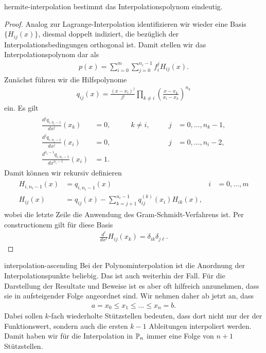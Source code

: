 \begin{Satz}{hermite-interpolation}
   bestimmt das
  Interpolationspolynom eindeutig.
\end{Satz}

\begin{proof}
  Analog zur Lagrange-Interpolation identifizieren wir wieder eine
  Basis $\{H_{ij}(x)\}$, diesmal doppelt indiziert, die bezüglich der
  Interpolationsbedingungen orthogonal ist. Damit stellen wir das
  Interpolationspolynom dar als
  \begin{gather}
    p(x) = \sum_{i=0}^m \sum_{j=0}^{n_i-1} f_i^j H_{ij}(x).
  \end{gather}
  Zunächst führen wir die Hilfspolynome
  \begin{gather}
    q_{ij}(x) = \frac{(x-x_i)^j}{j!}\prod_{k\neq i}
    \left(\frac{x-x_k}{x_i-x_k}\right)^{n_k}
  \end{gather}
  ein. Es gilt
  \begin{gather}
    \begin{aligned}
      \frac{d^j q_{i,n_i-1}}{d x^j} (x_k) &=0,
      \quad &k\neq i,&\quad& j&=0,\dots,n_{k}-1,\\
      \frac{d^j q_{i,n_i-1}}{d x^j} (x_i) &=0,
      \qquad &&& j&=0,\dots,n_{i}-2,\\   
      \frac{d^{n_{i}-1} q_{i,n_i-1}}{d x^{n_{i}-1}} (x_i) &=1.
      \qquad &&&& 
    \end{aligned}
  \end{gather}
  Damit können wir rekursiv definieren
  \begin{gather}
    \begin{aligned}
      H_{i,n_i-1}(x) &= q_{i,n_i-1}(x)
      & i&= 0,\dots,m\\
      H_{ij}(x) &= q_{ij}(x) - \sum_{k=j+1}^{n_i-1} q_{ij}^{(k)}(x_i) H_{ik}(x),
    \end{aligned}
  \end{gather}
  wobei die letzte Zeile die Anwendung des Gram-Schmidt-Verfahrens
  ist. Per constructionem gilt für diese Basis
  \begin{gather}
    \frac{d^\ell}{dx^\ell} H_{ij}(x_k) = \delta_{ik}\delta_{j\ell}.
  \end{gather}
\end{proof}

\begin{Notation}{interpolation-ascending}
  Bei der Polynominterpolation ist die Anordnung der
  Interpolationspunkte beliebig. Das ist auch weiterhin der Fall. Für
  die Darstellung der Resultate und Beweise ist es aber oft hilfreich
  anzunehmen, dass sie in aufsteigender Folge angeordnet sind. Wir
  nehmen daher ab jetzt an, dass
  \begin{gather}
    a = x_0 \le x_1 \le \dots \le x_n = b.
  \end{gather}
  Dabei sollen $k$-fach wiederholte Stützstellen bedeuten, dass dort
  nicht nur der der Funktionswert, sondern auch die ersten $k-1$
  Ableitungen interpoliert werden. Damit haben wir für die
  Interpolation in $\P_n$ immer eine Folge von $n+1$ Stützstellen.
\end{Notation}

